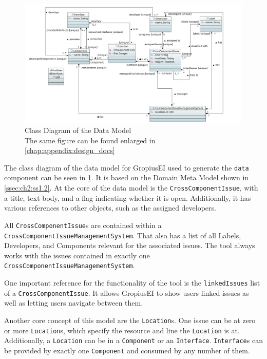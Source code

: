 \begin{figure}[!h]
	\centering
	\includegraphics[width=\textwidth]{graphics/dataClassDiagram.png}
	\caption{Class Diagram of the Data Model \\ \footnotesize{The same figure can be found enlarged in \cref{chap:appendix:design_docs}}}
	\label{fig:c4:data_class_diagram}
\end{figure}
The class diagram of the data model for \gls{GropiusEI} used to generate the \lstinline|data| component can be seen in \cref{fig:c4:data_class_diagram}.
It is based on the Domain Meta Model shown in \cref{ssec:ch2:ss1.2}.
At the core of the data model is the \lstinline|CrossComponentIssue|, with a title, text body, and a flag indicating whether it is open.
Additionally, it has various references to other objects, such as the assigned developers.

All \lstinline|CrossComponentIssue|s are contained within a \lstinline|CrossComponentIssueManagementSystem|.
That also has a list of all Labels, Developers, and Components relevant for the associated issues.
The tool always works with the issues contained in exactly one \lstinline|CrossComponentIssueManagementSystem|.

One important reference for the functionality of the tool is the \lstinline|linkedIssues| list of a \lstinline|CrossComponentIssue|.
It allows \gls{GropiusEI} to show users linked issues as well as letting users navigate between them.

Another core concept of this model are the \lstinline|Location|s.
One issue can be at zero or more \lstinline|Location|s, which specify the resource and line the \lstinline|Location| is at.
Additionally, a \lstinline|Location| can be in a \lstinline|Component| or an \lstinline|Interface|.
\lstinline|Interface|s can be provided by exactly one \lstinline|Component| and consumed by any number of them.

